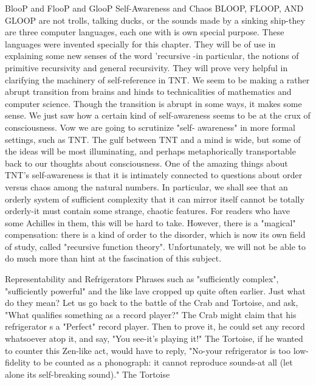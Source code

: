                       BlooP and FlooP and GlooP
                             Self-Awareness and Chaos
BLOOP, FLOOP, AND GLOOP are not trolls, talking ducks, or the sounds made by a
sinking ship-they are three computer languages, each one with is own special purpose.
These languages were invented specially for this chapter. They will be of use in
explaining some new senses of the word 'recursive -in particular, the notions of primitive
recursivity and general recursivity. They will prove very helpful in clarifying the
machinery of self-reference in TNT.
         We seem to be making a rather abrupt transition from brains and hinds to
technicalities of mathematics and computer science. Though the transition is abrupt in
some ways, it makes some sense. We just saw how a certain kind of self-awareness
seems to be at the crux of consciousness. Vow we are going to scrutinize "self-
awareness" in more formal settings, such as TNT. The gulf between TNT and a mind is
wide, but some of the ideas will be most illuminating, and perhaps metaphorically
transportable back to our thoughts about consciousness.
         One of the amazing things about TNT's self-awareness is that it is intimately
connected to questions about order versus chaos among the natural numbers. In
particular, we shall see that an orderly system of sufficient complexity that it can mirror
itself cannot be totally orderly-it must contain some strange, chaotic features. For readers
who have some Achilles in them, this will be hard to take. However, there is a "magical"
compensation: there is a kind of order to the disorder, which is now its own field of
study, called "recursive function theory". Unfortunately, we will not be able to do much
more than hint at the fascination of this subject.

                       Representability and Refrigerators
Phrases such as "sufficiently complex", "sufficiently powerful" and the like lave cropped
up quite often earlier. Just what do they mean? Let us go back to the battle of the Crab
and Tortoise, and ask, "What qualifies something as a record player?" The Crab might
claim that his refrigerator s a "Perfect" record player. Then to prove it, he could set any
record whatsoever atop it, and say, "You see-it's playing it!" The Tortoise, if he wanted to
counter this Zen-like act, would have to reply, "No-your refrigerator is too low-fidelity to
be counted as a phonograph: it cannot reproduce sounds-at all (let alone its self-breaking
sound)." The Tortoise




